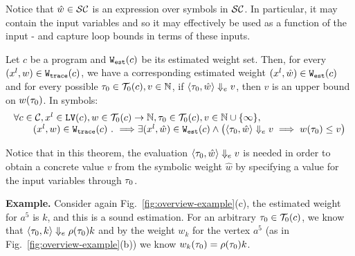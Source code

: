 Notice that $\hat{w} \in \mathcal{SC}$ is an expression over symbols in $\mathcal{SC}$. In particular, it may contain the input variables and so it may effectively be used as a function of the input - and capture loop bounds in terms of these inputs.
\begin{thm}
 \label{thm:addweight_soundness}
Let ${c}$ be a program and $\mathtt{{W_{est}}}(c)$ be its estimated weight set.
Then, for every  $(x^l, w) \in \mathtt{{W_{trace}}}(c) $,
we have a corresponding estimated weight $(x^l, \hat{w}) \in \mathtt{{W_{est}}}(c)$ and for every possible 
$\mathtt{\tau}_0 \in \mathcal{T}_0(c),
v \in \mathbb{N}$,
if $\langle \mathtt{\tau}_0, \hat{w} \rangle \Downarrow_e v$,
then $v$ is an upper bound on ${w}(\mathtt{\tau}_0)$. In symbols:
\[
 \begin{array}{l}
 \forall c \in \mathcal{C}, x^l \in \mathtt{LV}(c),w\in \mathcal{T}_0(c)\to \mathbb{N},\mathtt{\tau}_0 \in \mathcal{T}_0(c), 
v \in \mathbb{N}\cup \{\infty\}, 
\\ \qquad
(x^l, w) \in \mathtt{{W_{trace}}}(c) ~.~ \Longrightarrow
\exists
(x^l, \hat{w}) \in \mathtt{{W_{est}}}(c) 
\land
\big(
 \langle \mathtt{\tau}_0, \hat{w} \rangle \Downarrow_e v \implies w(\mathtt{\tau}_0) \leq v
\big)
\end{array}
\]
\end{thm}
Notice that in this theorem, the evaluation $\langle \mathtt{\tau}_0, \hat{w} \rangle \Downarrow_e v$ is needed in order to obtain a concrete value $v$ from the symbolic weight $\hat{w}$ by specifying a value for the input variables through $\mathtt{\tau}_0$.


\textbf{Example.} 
Consider again
Fig.~\ref{fig:overview-example}(c),
the estimated weight for $a^5$ is $k$, and this is a sound estimation.
For an arbitrary $\mathtt{\tau}_0 \in \mathcal{T}_0(c)$, we know that $\langle \mathtt{\tau}_0, k \rangle \Downarrow_e \rho(\mathtt{\tau}_0) k$ and
by the weight $w_k$ for the vertex $a^5$ (as in Fig.~\ref{fig:overview-example}(b)) we know 
$w_k(\mathtt{\tau}_0) = \rho(\mathtt{\tau}_0) k$. 
%
\subsubsection{}
